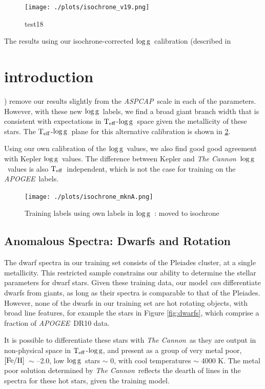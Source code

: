 \documentclass[12pt, preprint]{aastex}
\newcommand{\teff}{\mbox{$\rm T_{eff}$}}
\newcommand{\feh}{\mbox{$\rm [Fe/H]$}}
\newcommand{\logg}{\mbox{$\rm \log g$}}
\newcommand{\tc}{\textsl{The Cannon}}
\newcommand{\apogee}{\textsl{APOGEE}}
\newcommand{\aspcap}{\textsl{ASPCAP}}
\begin{document}
\begin{figure}[h!]
  \texttt{[image: ./plots/isochrone\_v19.png]}
\caption{test18}
\label{fig:test18}
\end{figure}

The results using our isochrone-corrected \logg\ calibration (described in \section{introduction}) remove our results slightly from the \aspcap\ scale in each of the parameters. However, with these new \logg\ labels, we find a broad giant branch width that is consistent with expectations in \teff-\logg\ space given the metallicity of these stars. The \teff-\logg\ plane for this alternative calibration is shown in \ref{fig:mknA}. 

Using our own calibration of the \logg\ values, we also find good  good agreement with Kepler \logg\ values. The difference between Kepler and \tc\ \logg\ values is also \teff\ independent, which is not the case for training on the \apogee\ labels. 


\begin{figure}[h!]
  \texttt{[image: ./plots/isochrone\_mknA.png]}
\caption{Training labels using own labels in \logg\ : moved to isochrone}
\label{fig:mknA}
\end{figure}

\subsection{Anomalous Spectra: Dwarfs and Rotation}

The dwarf spectra in our training set consists of the Pleiades cluster, at a single metallicity. This restricted sample constrains our ability to determine the stellar parameters for dwarf stars. Given these training data, our model \textit{can} differentiate dwarfs from giants, as long as their spectra is comparable to that of the Pleiades. However, none of the dwarfs in our training set are hot rotating objects, with broad line features, for example the stars in Figure \ref{fig:dwarfs}, which comprise a fraction of \apogee\ DR10 data. 

It is possible to differentiate these stars with \tc\, as they are output in non-physical space in \teff-\logg, and present as a group of very metal poor, \feh\ $\sim$ --2.0, low \logg\ stars $\sim$ 0, with cool temperatures $\sim$ 4000 K. The metal poor solution determined by \tc\ reflects the dearth of lines in the spectra for these hot stars, given the training model. 
\end{document}
